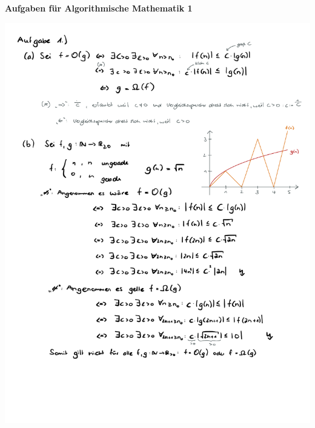 \documentclass[a4paper,oneside,11pt]{scrartcl}
\begin{document}

\begin{center}
{\Large{\textbf{Aufgaben für Algorithmische Mathematik 1}}} \\
\end{center}
\begin{minipage}[t]{\textwidth}
\includegraphics[scale = 0.75, page=1]{AlMa1_Zettel04.pdf}
\end{minipage}
\pagebreak
\end{document}
